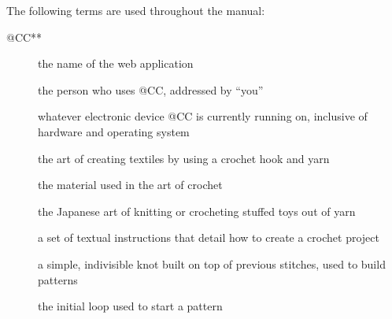 \documentclass[main.tex]{subfiles}
\begin{document}
The following terms are used throughout the manual:

\begin{description}
\item[@CC**] the name of the web application
\item[] the person who uses @CC, addressed by ``you''
\item[] whatever electronic device @CC is currently running on, inclusive of hardware and operating system

\item[] the art of creating textiles by using a crochet hook and yarn
\item[] the material used in the art of crochet
\item[] the Japanese art of knitting or crocheting stuffed toys out of yarn
\item[] a set of textual instructions that detail how to create a crochet project
\item[] a simple, indivisible knot built on top of previous stitches, used to build patterns
\item[] the initial loop used to start a pattern


\end{description}
\end{document}

